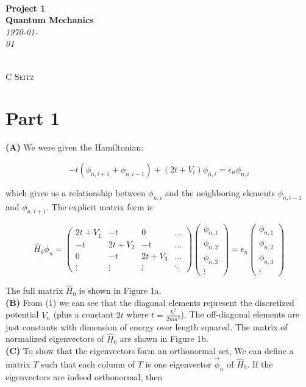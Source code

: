 \documentclass[12pt]{article}
\theoremstyle{definition}
\begin{document}
 {\noindent\Huge\bf  \\[0.5\baselineskip] {\selectfont  Project 1}         }\\[2\baselineskip] %
{ {\bf {}\selectfont Quantum Mechanics}\\ {\textit{\selectfont     \today}}}~~~~~~~~~~~~~~~~~~~~~~~~~~~~~~~~~~~~~~~~~~~~~~~~~~~~~~~~~~~~~~~~~~~~~~~~~~~~~    {\large \textsc{C Seitz}
\\[1.4\baselineskip] 

\section{Part 1}

\textbf{(A)} We were given the Hamiltonian:

\begin{equation*}
-t(\phi_{n,i+1} + \phi_{n,i-1}) + (2t+V_{i})\phi_{n,i} = \epsilon_{n}\phi_{n,i}
\end{equation*}

which gives us a relationship between $\phi_{n,i}$ and the neighboring elements $\phi_{n,i-1}$ and $\phi_{n,i+1}$. The explicit matrix form is

\begin{equation}
\hat{H}_{0}\phi_{n} = \begin{pmatrix}
2t + V_{1} & -t & 0 & \hdots\\
-t & 2t + V_{2} & -t& \hdots\\
0 & -t & 2t + V_{3}& \hdots\\
\vdots & \vdots & \vdots & \ddots
\end{pmatrix}
\begin{pmatrix}
\phi_{n,1}\\
\phi_{n,2}\\
\phi_{n,3}\\
\vdots
\end{pmatrix} = \epsilon_{n}\begin{pmatrix}
\phi_{n,1}\\
\phi_{n,2}\\
\phi_{n,3}\\
\vdots
\end{pmatrix}
\end{equation}

The full matrix $\hat{H}_{0}$ is shown in Figure 1a. 
\vspace{0.1in}\\
\noindent \textbf{(B)} From (1) we can see that the diagonal elements represent the discretized potential $V_{n}$ (plus a constant $2t$ where $t = \frac{\hbar^{2}}{2ma^{2}}$). The off-diagonal elements are just constants with dimension of energy over length squared. The matrix of normalized eigenvectors of $\hat{H}_{0}$ are shown in Figure 1b.
\vspace{0.1in}\\
\noindent\textbf{(C)} To show that the eigenvectors form an orthonormal set, We can define a matrix $T$ such that each column of $T$ is one eigenvector $\vec{\phi}_{n}$ of $\hat{H}_{0}$. If the eigenvectors are indeed orthonormal, then

}
\end{document}
